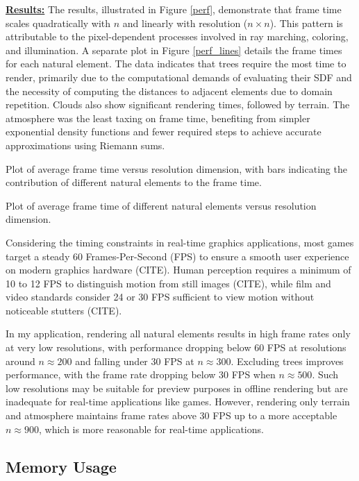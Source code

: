 \textbf{\underline{Results:}}
The results, illustrated in Figure \ref{perf}, demonstrate that frame time scales quadratically with $n$ and linearly with resolution ($n \times n$). This pattern is attributable to the pixel-dependent processes involved in ray marching, coloring, and illumination. A separate plot in Figure \ref{perf_lines} details the frame times for each natural element. The data indicates that trees require the most time to render, primarily due to the computational demands of evaluating their SDF and the necessity of computing the distances to adjacent elements due to domain repetition. Clouds also show significant rendering times, followed by terrain. The atmosphere was the least taxing on frame time, benefiting from simpler exponential density functions and fewer required steps to achieve accurate approximations using Riemann sums.

{Plot of average frame time versus resolution dimension, with bars indicating the contribution of different natural elements to the frame time.}

{Plot of average frame time of different natural elements versus resolution dimension.}

Considering the timing constraints in real-time graphics applications, most games target a steady 60 Frames-Per-Second (FPS) to ensure a smooth user experience on modern graphics hardware (CITE). Human perception requires a minimum of 10 to 12 FPS to distinguish motion from still images (CITE), while film and video standards consider 24 or 30 FPS sufficient to view motion without noticeable stutters (CITE).

In my application, rendering all natural elements results in high frame rates only at very low resolutions, with performance dropping below 60 FPS at resolutions around $n \approx 200$ and falling under 30 FPS at $n \approx 300$. Excluding trees improves performance, with the frame rate dropping below 30 FPS when $n \approx 500$. Such low resolutions may be suitable for preview purposes in offline rendering but are inadequate for real-time applications like games. However, rendering only terrain and atmosphere maintains frame rates above 30 FPS up to a more acceptable $n \approx 900$, which is more reasonable for real-time applications.


\subsection{Memory Usage}

